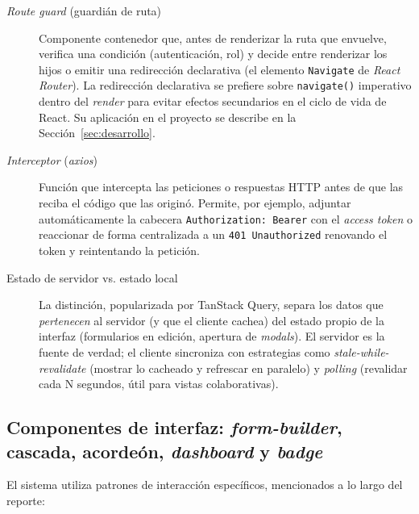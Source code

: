 \begin{description}
    \item[\emph{Route guard} (guardián de ruta)] Componente contenedor que, antes de renderizar la ruta que envuelve, verifica una condición (autenticación, rol) y decide entre renderizar los hijos o emitir una redirección declarativa (el elemento \texttt{Navigate} de \emph{React Router}). La redirección declarativa se prefiere sobre \texttt{navigate()} imperativo dentro del \emph{render} para evitar efectos secundarios en el ciclo de vida de React. Su aplicación en el proyecto se describe en la Sección~\ref{sec:desarrollo}.
    \item[\emph{Interceptor} (\emph{axios})] Función que intercepta las peticiones o respuestas HTTP antes de que las reciba el código que las originó. Permite, por ejemplo, adjuntar automáticamente la cabecera \texttt{Authorization: Bearer} con el \emph{access token} o reaccionar de forma centralizada a un \texttt{401 Unauthorized} renovando el token y reintentando la petición.
    \item[Estado de servidor vs. estado local] La distinción, popularizada por TanStack Query, separa los datos que \emph{pertenecen} al servidor (y que el cliente cachea) del estado propio de la interfaz (formularios en edición, apertura de \emph{modals}). El servidor es la fuente de verdad; el cliente sincroniza con estrategias como \emph{stale-while-revalidate} (mostrar lo cacheado y refrescar en paralelo) y \emph{polling} (revalidar cada N segundos, útil para vistas colaborativas).
\end{description}

\subsection{Componentes de interfaz: \emph{form-builder}, cascada, acordeón, \emph{dashboard} y \emph{badge}}\label{subsec:ui-patterns}

El sistema utiliza patrones de interacción específicos, mencionados a lo largo del reporte:

